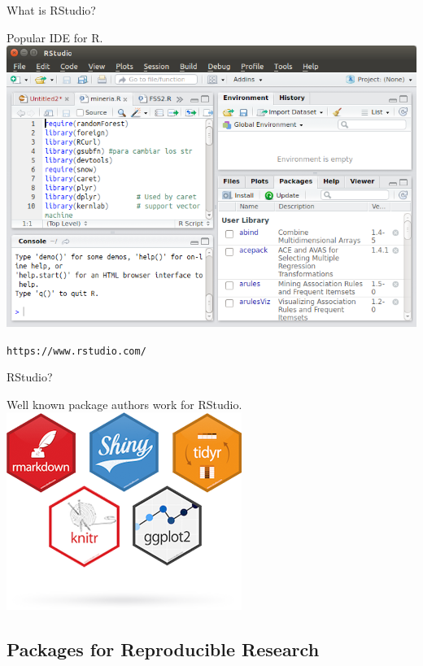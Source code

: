 \documentclass{beamer}
\begin{document}
\begin{frame}{What is RStudio?} %

Popular IDE for R.
\includegraphics[height=.50\textwidth]{figs/RStudio.png}

\texttt{https://www.rstudio.com/}

\end{frame}


\begin{frame}{RStudio?} %

Well known package authors work for RStudio.
\includegraphics[height=.50\textwidth]{figs/r-packages.png}


\end{frame}



\subsection[Packages]{Packages for Reproducible Research}
\end{document}
